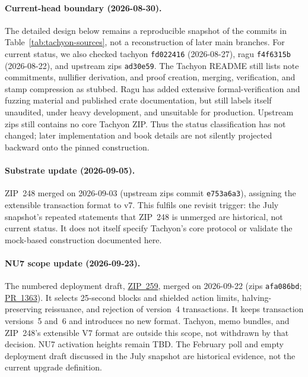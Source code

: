 \documentclass[11pt,a4paper]{article}
\theoremstyle{definition}
\begin{document}
\paragraph{Current-head boundary (2026-08-30).} The detailed design below
remains a reproducible snapshot of the commits in
Table~\ref{tab:tachyon-sources}, not a reconstruction of later main branches.
For current status, we also checked \textsf{tachyon} \texttt{fd022416}
(2026-08-27), \textsf{ragu} \texttt{f4f6315b} (2026-08-22), and upstream
\textsf{zips} \texttt{ad30e59}. The Tachyon README still lists note
commitments, nullifier derivation, and proof creation, merging, verification,
and stamp compression as stubbed. Ragu has added extensive formal-verification
and fuzzing material and published crate documentation, but still labels
itself unaudited, under heavy development, and unsuitable for production.
Upstream \textsf{zips} still contains no core Tachyon ZIP. Thus the status
classification has not changed; later implementation and book details are not
silently projected backward onto the pinned construction.

\paragraph{Substrate update (2026-09-05).} ZIP~248 merged on
2026-09-03 (upstream \textsf{zips} commit \texttt{e753a6a3}), assigning
the extensible transaction format to v7. This fulfils one revisit trigger:
the July snapshot's repeated statements that ZIP~248 is unmerged are
historical, not current status. It does not itself specify Tachyon's core
protocol or validate the mock-based construction documented here.

\paragraph{NU7 scope update (2026-09-23).} The numbered deployment draft,
\href{https://zips.z.cash/zip-0259}{ZIP~259}, merged on 2026-09-22
(\textsf{zips} \texttt{afa086bd};
\href{https://github.com/zcash/zips/pull/1363}{PR~1363}). It selects
25-second blocks and shielded action limits, halving-preserving reissuance,
and rejection of version~4 transactions. It keeps transaction versions~5
and~6 and introduces no new format. Tachyon, memo bundles, and ZIP~248's
extensible V7 format are outside this scope, not withdrawn by that
decision. NU7 activation heights remain TBD. The February poll and empty
deployment draft discussed in the July snapshot are historical evidence,
not the current upgrade definition.
\end{document}
